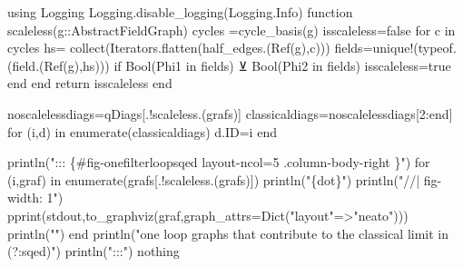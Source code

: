 \documentclass[
  11pt,
  a4paper,
  DIV=11,
  numbers=noendperiod,
  oneside]{scrreprt}
\newenvironment{Shaded}{\begin{snugshade}}{\end{snugshade}}
\newcommand{\BuiltInTok}[1]{\textcolor[rgb]{0.00,0.23,0.31}{#1}}
\newcommand{\ConstantTok}[1]{\textcolor[rgb]{0.56,0.35,0.01}{#1}}
\newcommand{\ControlFlowTok}[1]{\textcolor[rgb]{0.00,0.23,0.31}{#1}}
\newcommand{\DataTypeTok}[1]{\textcolor[rgb]{0.68,0.00,0.00}{#1}}
\newcommand{\FloatTok}[1]{\textcolor[rgb]{0.68,0.00,0.00}{#1}}
\newcommand{\FunctionTok}[1]{\textcolor[rgb]{0.28,0.35,0.67}{#1}}
\newcommand{\ImportTok}[1]{\textcolor[rgb]{0.00,0.46,0.62}{#1}}
\newcommand{\KeywordTok}[1]{\textcolor[rgb]{0.00,0.23,0.31}{#1}}
\newcommand{\NormalTok}[1]{\textcolor[rgb]{0.00,0.23,0.31}{#1}}
\newcommand{\OperatorTok}[1]{\textcolor[rgb]{0.37,0.37,0.37}{#1}}
\newcommand{\StringTok}[1]{\textcolor[rgb]{0.13,0.47,0.30}{#1}}
\DeclareRobustCommand{\[}{\begin{equation}}
\DeclareRobustCommand{\]}{\end{equation}}
\begin{document}
\begin{Shaded}
\begin{Highlighting}[]
\ImportTok{using} \BuiltInTok{Logging}
\BuiltInTok{Logging}\NormalTok{.}\FunctionTok{disable\_logging}\NormalTok{(}\BuiltInTok{Logging}\NormalTok{.Info)}
\KeywordTok{function} \FunctionTok{scaleless}\NormalTok{(g}\OperatorTok{::}\DataTypeTok{AbstractFieldGraph}\NormalTok{)}
\NormalTok{  cycles }\OperatorTok{=}\FunctionTok{cycle\_basis}\NormalTok{(g)}
\NormalTok{  isscaleless}\OperatorTok{=}\ConstantTok{false}
  \ControlFlowTok{for}\NormalTok{ c }\KeywordTok{in}\NormalTok{ cycles}
\NormalTok{    hs}\OperatorTok{=} \FunctionTok{collect}\NormalTok{(}\BuiltInTok{Iterators}\NormalTok{.}\FunctionTok{flatten}\NormalTok{(}\FunctionTok{half\_edges}\NormalTok{.(}\FunctionTok{Ref}\NormalTok{(g),c)))}
\NormalTok{    fields}\OperatorTok{=}\FunctionTok{unique!}\NormalTok{(}\FunctionTok{typeof}\NormalTok{.(}\FunctionTok{field}\NormalTok{.(}\FunctionTok{Ref}\NormalTok{(g),hs)))}
    \ControlFlowTok{if} \FunctionTok{Bool}\NormalTok{(Phi1 }\KeywordTok{in}\NormalTok{ fields) }\OperatorTok{⊻}  \FunctionTok{Bool}\NormalTok{(Phi2 }\KeywordTok{in}\NormalTok{ fields)}
\NormalTok{      isscaleless}\OperatorTok{=}\ConstantTok{true}
    \ControlFlowTok{end}
  \ControlFlowTok{end}
  \ControlFlowTok{return}\NormalTok{ isscaleless}
\KeywordTok{end}

\NormalTok{noscalelessdiags}\OperatorTok{=}\NormalTok{qDiags[.!}\FunctionTok{scaleless}\NormalTok{.(grafs)]}
\NormalTok{classicaldiags}\OperatorTok{=}\NormalTok{noscalelessdiags[}\FloatTok{2}\OperatorTok{:}\KeywordTok{end}\NormalTok{]}
\ControlFlowTok{for}\NormalTok{ (i,d) }\KeywordTok{in} \FunctionTok{enumerate}\NormalTok{(classicaldiags)}
\NormalTok{  d.ID}\OperatorTok{=}\NormalTok{i}
\ControlFlowTok{end}

\FunctionTok{println}\NormalTok{(}\StringTok{"::: \{\#fig{-}onefilterloopsqed  layout{-}ncol=5 .column{-}body{-}right \}"}\NormalTok{)}
\ControlFlowTok{for}\NormalTok{ (i,graf) }\KeywordTok{in} \FunctionTok{enumerate}\NormalTok{(grafs[.!}\FunctionTok{scaleless}\NormalTok{.(grafs)])}
\FunctionTok{println}\NormalTok{(}\StringTok{"\textasciigrave{}\textasciigrave{}\textasciigrave{}\{dot\}"}\NormalTok{)}
\FunctionTok{println}\NormalTok{(}\StringTok{"//| fig{-}width: 1"}\NormalTok{)}
    \FunctionTok{pprint}\NormalTok{(}\ConstantTok{stdout}\NormalTok{,}\FunctionTok{to\_graphviz}\NormalTok{(graf,graph\_attrs}\OperatorTok{=}\FunctionTok{Dict}\NormalTok{(}\StringTok{"layout"}\OperatorTok{=\textgreater{}}\StringTok{"neato"}\NormalTok{)))}
    \FunctionTok{println}\NormalTok{(}\StringTok{"\textasciigrave{}\textasciigrave{}\textasciigrave{}"}\NormalTok{)}
\ControlFlowTok{end}
\FunctionTok{println}\NormalTok{(}\StringTok{"one loop graphs that contribute to the classical limit in (?:sqed)"}\NormalTok{)}
\FunctionTok{println}\NormalTok{(}\StringTok{":::"}\NormalTok{)}
\ConstantTok{nothing}
\end{Highlighting}
\end{Shaded}
\end{document}
